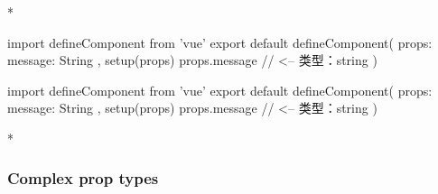 \begin{paracol}{2} 
 
\switchcolumn[0]*%
\begin{codeTs}
import { defineComponent } from 'vue'
export default defineComponent({
  props: {
    message: String
  },
  setup(props) {
    props.message // <-- 类型：string
  }
})
\end{codeTs}
\switchcolumn
\begin{codeTs}
import { defineComponent } from 'vue'
export default defineComponent({
  props: {
    message: String
  },
  setup(props) {
    props.message // <-- 类型：string
  }
})
\end{codeTs}
\switchcolumn[0]*%
\subsubsection{Complex prop types}
\switchcolumn

\end{paracol}
